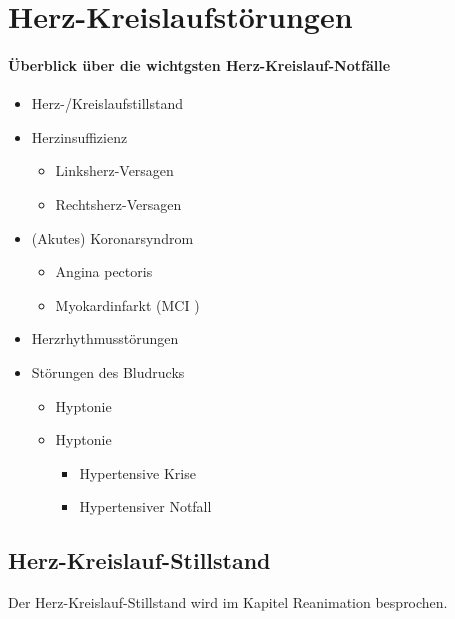 \section{Herz-Kreislaufstörungen}


\label{bkm:RefHeading42342802}

\paragraph{Überblick über die wichtgsten
Herz-Kreislauf-Notfälle}

\begin{itemize}
    \item Herz-/Kreislaufstillstand
    \item Herzinsuffizienz
    \begin{itemize}
        \item Linksherz-Versagen
        \item Rechtsherz-Versagen
    \end{itemize}
    \item (Akutes) Koronarsyndrom
    \begin{itemize}
        \item Angina pectoris
        \item Myokardinfarkt (MCI )
    \end{itemize}
    \item Herzrhythmusst\"orungen
    \item Störungen des Bludrucks
    \begin{itemize}
        \item Hyptonie
        \item Hyptonie
        \begin{itemize}
            \item Hypertensive Krise
            \item Hypertensiver Notfall
        \end{itemize}
    \end{itemize}
\end{itemize}


\subsection{Herz-Kreislauf-Stillstand}

Der Herz-Kreislauf-Stillstand wird
im Kapitel Reanimation besprochen.

